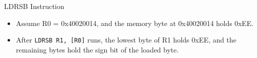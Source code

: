 \documentclass[9pt,aspectratio=169,xcolor=table]{beamer}
\begin{document}
{\begin{frame}[fragile]{LDRSB Instruction}
{%
	}
	\vspace{4mm}

	\begin{itemize}
		\item Assume R0 = 0x40020014, and the \alert{memory byte} at 0x40020014 holds 0xEE.
		\item After \texttt{LDRSB R1, [R0]} runs, the lowest byte of R1 holds 0xEE, and the remaining bytes hold the sign bit of the loaded byte.
	\end{itemize}
\end{frame}
}

\end{document}
